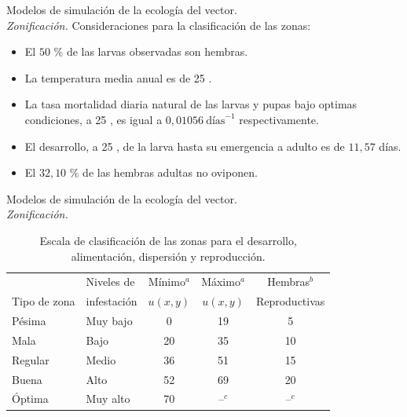 \begin{frame}[c]{Modelos de simulación de la ecología del vector.\\\textit{Zonificación.}}
  Consideraciones para la clasificación de las zonas:
  \begin{itemize}
      \item El $50$ \% de las larvas observadas son hembras.
      \item La temperatura media anual es de 25 \textcelsius.
      \item La tasa mortalidad diaria natural de las larvas y pupas bajo optimas condiciones, a 25 \textcelsius, es igual a $0,01056\ \text{días}^{-1}$ respectivamente.
      \item El desarrollo, a 25 \textcelsius, de la larva hasta su emergencia a adulto es de $11,57$ días.
      \item El $32,10$ \% de las hembras adultas no oviponen.
  \end{itemize}
\end{frame}

\begin{frame}[t]{Modelos de simulación de la ecología del vector.\\\textit{Zonificación.}}

  \begin{table}
        \begin{minipage}{\textwidth}
          \centering
          \scriptsize
            \caption{\label{tab:cap4-puntaje-zona} Escala de clasificación de las zonas
            para el desarrollo, alimentación, dispersión y reproducción.}
            \begin{tabular}{l l c c c}
                \hline
                             & Niveles de & Mínimo$^a$ & Máximo$^a$  & Hembras$^b$ \\
                Tipo de zona & infestación & $u(x,y)$   & $u(x,y)$   & Reproductivas \\
                \hline
                \hline
                Pésima  & Muy bajo & 0  & 19 & 5 \\
                Mala    & Bajo     &20  & 35 & 10\\
                Regular & Medio    &36  & 51 & 15\\
                Buena   & Alto     &52  & 69 & 20\\
                Óptima  & Muy alto &70  & --$^c$ & --$^c$
            \end{tabular}
        \end{minipage}
    \end{table}
\end{frame}

